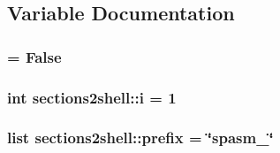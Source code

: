 \subsection{\-Variable \-Documentation}
\hypertarget{namespacesections2shell_a3667169ba9afc983db41b0b9aea336cb}{
\subsubsection[{header}]{ = \-False}}\label{namespacesections2shell_a3667169ba9afc983db41b0b9aea336cb}
\hypertarget{namespacesections2shell_a4e78c48a579d23a2c6de71ac9359a9b9}{
\subsubsection[{i}]{\setlength{\rightskip}{0pt plus 5cm}int {\bf sections2shell\-::i} = 1}}\label{namespacesections2shell_a4e78c48a579d23a2c6de71ac9359a9b9}
\hypertarget{namespacesections2shell_a61765c6e86e717fdfa778f3533b3b621}{
\subsubsection[{prefix}]{\setlength{\rightskip}{0pt plus 5cm}list {\bf sections2shell\-::prefix} = \char`\"{}spasm\-\_\-\char`\"{}}}\label{namespacesections2shell_a61765c6e86e717fdfa778f3533b3b621}
